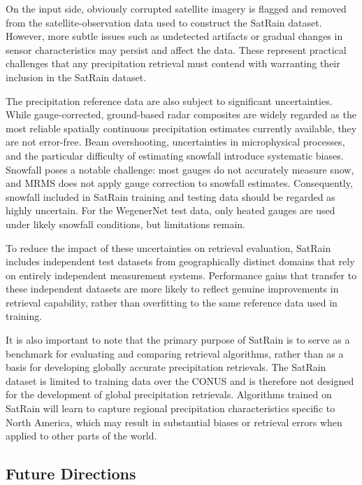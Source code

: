 \documentclass[11pt]{article}
\begin{document}
On the input side, obviously corrupted satellite imagery is flagged and removed
from the satellite-observation data used to construct the SatRain dataset.
However, more subtle issues such as undetected artifacts or gradual changes in
sensor characteristics may persist and affect the data. These represent
practical challenges that any precipitation retrieval must contend with
warranting their inclusion in the SatRain dataset.

The precipitation reference data are also subject to significant uncertainties.
While gauge-corrected, ground-based radar composites are widely regarded as the
most reliable spatially continuous precipitation estimates currently available,
they are not error-free. Beam overshooting, uncertainties in microphysical
processes, and the particular difficulty of estimating snowfall introduce
systematic biases. Snowfall poses a notable challenge: most gauges do not
accurately measure snow, and MRMS does not apply gauge correction to snowfall
estimates. Consequently, snowfall included in SatRain training and testing data
should be regarded as highly uncertain. For the WegenerNet test data, only
heated gauges are used under likely snowfall conditions, but limitations remain.

To reduce the impact of these uncertainties on retrieval evaluation, SatRain
includes independent test datasets from geographically distinct domains that
rely on entirely independent measurement systems. Performance gains that
transfer to these independent datasets are more likely to reflect genuine
improvements in retrieval capability, rather than overfitting to the same
reference data used in training.

It is also important to note that the primary purpose of SatRain is to serve as
a benchmark for evaluating and comparing retrieval algorithms, rather than as a
basis for developing globally accurate precipitation retrievals. The SatRain
dataset is limited to training data over the CONUS and is therefore not designed
for the development of global precipitation retrievals. Algorithms trained on
SatRain will learn to capture regional precipitation characteristics specific to
North America, which may result in substantial biases or retrieval errors when
applied to other parts of the world.

\subsection{Future Directions}
\end{document}
